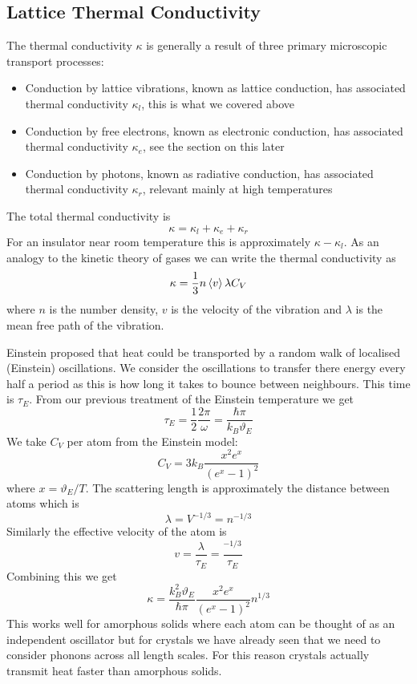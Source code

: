     \subsection{Lattice Thermal Conductivity}
    The thermal conductivity \(\kappa\) is generally a result of three primary microscopic transport processes:
    \begin{itemize}
        \item Conduction by lattice vibrations, known as lattice conduction, has associated thermal conductivity \(\kappa_l\), this is what we covered above
        \item Conduction by free electrons, known as electronic conduction, has associated thermal conductivity \(\kappa_e\), see the section on this later
        \item Conduction by photons, known as radiative conduction, has associated thermal conductivity \(\kappa_r\), relevant mainly at high temperatures
    \end{itemize}
    The total thermal conductivity is
    \[\kappa = \kappa_l + \kappa_e + \kappa_r\]
    For an insulator near room temperature this is approximately \(\kappa - \kappa_l\).
    As an analogy to the kinetic theory of gases we can write the thermal conductivity as
    \[\kappa = \frac{1}{3}n\expval{v}\lambda C_V\]
    where \(n\) is the number density, \(v\) is the velocity of the vibration and \(\lambda\) is the mean free path of the vibration.
    
    Einstein proposed that heat could be transported by a random walk of localised (Einstein) oscillations.
    We consider the oscillations to transfer there energy every half a period as this is how long it takes to bounce between neighbours.
    This time is \(\tau_E\).
    From our previous treatment of the Einstein temperature we get
    \[\tau_E = \frac{1}{2}\frac{2\pi}{\omega} = \frac{\hbar\pi}{k_B\vartheta_E}\]
    We take \(C_V\) per atom from the Einstein model:
    \[C_V = 3k_B\frac{x^2e^x}{(e^x - 1)^2}\]
    where \(x = \vartheta_E/T\).
    The scattering length is approximately the distance between atoms which is
    \[\lambda = V^{-1/3} = n^{-1/3}\]
    Similarly the effective velocity of the atom is
    \[v = \frac{\lambda}{\tau_E} = \frac{^{-1/3}}{\tau_E}\]
    Combining this we get
    \[\kappa = \frac{k_B^2\vartheta_E}{\hbar\pi}\frac{x^2e^x}{(e^x - 1)^2}n^{1/3}\]
    This works well for amorphous solids where each atom can be thought of as an independent oscillator but for crystals we have already seen that we need to consider phonons across all length scales.
    For this reason crystals actually transmit heat faster than amorphous solids.
     
